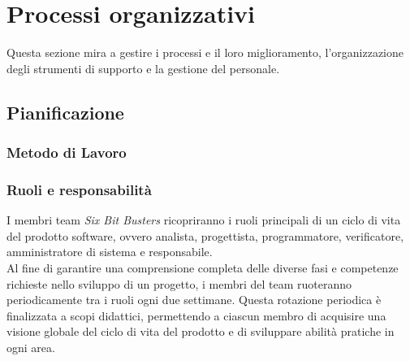 \section{Processi organizzativi}
Questa sezione mira a gestire i processi e il loro miglioramento, l'organizzazione degli strumenti
di supporto e la gestione del personale.

    \subsection{Pianificazione}
        \subsubsection{Metodo di Lavoro}
        \subsubsection{Ruoli e responsabilità}
            I membri team \textit{Six Bit Busters} ricopriranno i ruoli principali 
            di un ciclo di vita del prodotto software, ovvero analista, 
            progettista, programmatore, verificatore, amministratore di sistema e responsabile. 
            \\Al fine di garantire una comprensione completa delle diverse fasi 
            e competenze richieste nello sviluppo di un progetto, i membri del team 
            ruoteranno periodicamente tra i ruoli ogni due settimane. Questa rotazione 
            periodica è finalizzata a scopi didattici, permettendo a ciascun membro di 
            acquisire una visione globale del ciclo di vita del prodotto e di sviluppare 
            abilità pratiche in ogni area.
